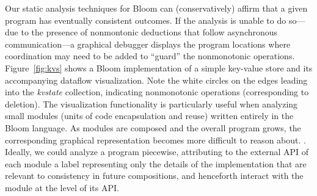 
Our static analysis techniques for Bloom can
(conservatively) affirm that a given program has eventually consistent outcomes.
If the analysis is unable to do so---due to the presence of nonmontonic deductions
that follow asynchronous communication---a graphical debugger displays the
program locations where coordination may need to be added to ``guard'' the
nonmonotonic operations.  
Figure~\ref{fig:kvs} shows a Bloom implementation of a simple key-value store
and its accompanying dataflow visualization.  Note the white circles on the edges leading
into the \emph{kvstate} collection, indicating nonmonotonic operations (corresponding to 
deletion).
The visualization functionality is particularly useful when
analyzing small modules (units of code encapsulation and reuse) written 
entirely in the Bloom language.
As modules are composed and the overall program grows, the corresponding graphical representation becomes more difficult to reason about.  .  Ideally,
we could analyze a program piecewise, attributing to the external API of each module a
label representing only the details of the implementation that are relevant to
consistency in future compositions, and henceforth interact with the module at
the level of its API.  


